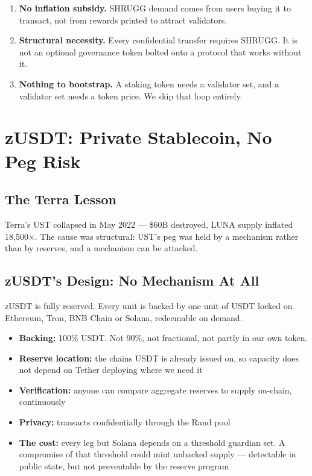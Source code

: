 \documentclass[11pt,a4paper]{article}
\begin{document}
\begin{enumerate}[leftmargin=*]
    \item \textbf{No inflation subsidy.} SHRUGG demand comes from users buying it to transact, not from rewards printed to attract validators.
    \item \textbf{Structural necessity.} Every confidential transfer requires SHRUGG. It is not an optional governance token bolted onto a protocol that works without it.
    \item \textbf{Nothing to bootstrap.} A staking token needs a validator set, and a validator set needs a token price. We skip that loop entirely.
\end{enumerate}

\section{zUSDT: Private Stablecoin, No Peg Risk}

\subsection{The Terra Lesson}

Terra's UST collapsed in May 2022 --- \$60B destroyed, LUNA supply inflated 18{,}500$\times$. The cause was structural: UST's peg was held by a mechanism rather than by reserves, and a mechanism can be attacked.

\subsection{zUSDT's Design: No Mechanism At All}

zUSDT is fully reserved. Every unit is backed by one unit of USDT locked on Ethereum, Tron, BNB Chain or Solana, redeemable on demand.

\begin{itemize}[leftmargin=*]
    \item \textbf{Backing:} 100\% USDT. Not 90\%, not fractional, not partly in our own token.
    \item \textbf{Reserve location:} the chains USDT is already issued on, so capacity does not depend on Tether deploying where we need it
    \item \textbf{Verification:} anyone can compare aggregate reserves to supply on-chain, continuously
    \item \textbf{Privacy:} transacts confidentially through the Rand pool
    \item \textbf{The cost:} every leg but Solana depends on a threshold guardian set. A compromise of that threshold could mint unbacked supply --- detectable in public state, but not preventable by the reserve program
\end{itemize}
\end{document}
